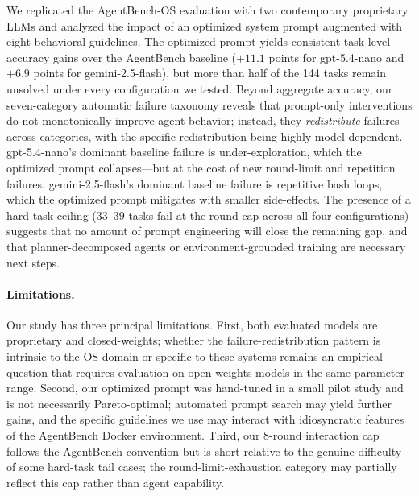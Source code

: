 \documentclass[11pt]{article}
\begin{document}
We replicated the AgentBench-OS evaluation with two contemporary
proprietary LLMs and analyzed the impact of an optimized system prompt
augmented with eight behavioral guidelines. The optimized prompt yields
consistent task-level accuracy gains over the AgentBench baseline
($+11.1$ points for gpt-5.4-nano and $+6.9$ points for
gemini-2.5-flash), but more than half of the 144 tasks remain unsolved
under every configuration we tested. Beyond aggregate accuracy, our
seven-category automatic failure taxonomy reveals that prompt-only
interventions do not monotonically improve agent behavior; instead,
they \emph{redistribute} failures across categories, with the specific
redistribution being highly model-dependent. gpt-5.4-nano's dominant
baseline failure is under-exploration, which the optimized prompt
collapses---but at the cost of new round-limit and repetition
failures. gemini-2.5-flash's dominant baseline failure is repetitive
bash loops, which the optimized prompt mitigates with smaller
side-effects. The presence of a hard-task ceiling ($33$--$39$ tasks
fail at the round cap across all four configurations) suggests that no
amount of prompt engineering will close the remaining gap, and that
planner-decomposed agents \citep{erdogan2025plan} or environment-grounded
training are necessary next steps.

\paragraph{Limitations.}
Our study has three principal limitations. First, both evaluated models
are proprietary and closed-weights; whether the failure-redistribution
pattern is intrinsic to the OS domain or specific to these systems
remains an empirical question that requires evaluation on open-weights
models in the same parameter range. Second, our optimized prompt was
hand-tuned in a small pilot study and is not necessarily Pareto-optimal;
automated prompt search may yield further gains, and the specific
guidelines we use may interact with idiosyncratic features of the
AgentBench Docker environment. Third, our 8-round interaction cap
follows the AgentBench convention but is short relative to the genuine
difficulty of some hard-task tail cases; the round-limit-exhaustion
category may partially reflect this cap rather than agent capability.





\appendix


\end{document}
